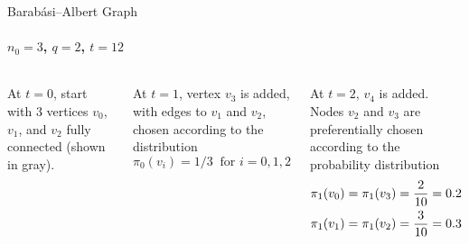 \begin{frame}{Barab\'{a}si--Albert Graph}
  \framesubtitle{$n_0=3$, $q=2$, $t=12$}

  \begin{columns}
  At $t=0$, start with 3 vertices $v_0$, $v_1$, and $v_2$ 
  fully connected
  (shown in gray).

	\smallskip
At $t=1$, vertex $v_3$ is added, with edges to
    $v_1$ and $v_2$, chosen according to the distribution $$\pi_0
    (v_i)={1/3} \;\; \text{for } i=0,1,2$$

	\smallskip
	At $t=2$, $v_4$ is added.
    Nodes $v_2$ and $v_3$ are preferentially chosen according to
    the probability distribution
    \begin{align*}
    \pi_1(v_0) & = \pi_1(v_3) = {2 \over 10} = 0.2\\
    \pi_1(v_1) & = \pi_1(v_2) = {3 \over 10} = 0.3
    \end{align*}


\end{columns}
\end{frame}

